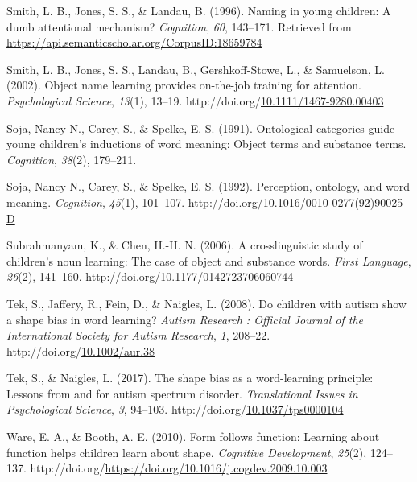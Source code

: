 \documentclass[10pt, letterpaper]{article}
\newenvironment{CSLReferences}%
  {}%
  {\par}
\begin{document}
\begin{CSLReferences}{1}{0}
\leavevmode{}%
Smith, L. B., Jones, S. S., \& Landau, B. (1996). Naming in young
children: A dumb attentional mechanism? \emph{Cognition}, \emph{60},
143--171. Retrieved from
\url{https://api.semanticscholar.org/CorpusID:18659784}

\leavevmode{}%
Smith, L. B., Jones, S. S., Landau, B., Gershkoff-Stowe, L., \&
Samuelson, L. (2002). Object name learning provides on-the-job training
for attention. \emph{Psychological Science}, \emph{13}(1), 13--19.
http://doi.org/\href{https://doi.org/10.1111/1467-9280.00403}{10.1111/1467-9280.00403}

\leavevmode{}%
Soja, Nancy N., Carey, S., \& Spelke, E. S. (1991). Ontological
categories guide young children's inductions of word meaning: Object
terms and substance terms. \emph{Cognition}, \emph{38}(2), 179--211.

\leavevmode{}%
Soja, Nancy N., Carey, S., \& Spelke, E. S. (1992). Perception,
ontology, and word meaning. \emph{Cognition}, \emph{45}(1), 101--107.
http://doi.org/\href{https://doi.org/10.1016/0010-0277(92)90025-D}{10.1016/0010-0277(92)90025-D}

\leavevmode{}%
Subrahmanyam, K., \& Chen, H.-H. N. (2006). A crosslinguistic study of
children's noun learning: {The} case of object and substance words.
\emph{First Language}, \emph{26}(2), 141--160.
http://doi.org/\href{https://doi.org/10.1177/0142723706060744}{10.1177/0142723706060744}

\leavevmode{}%
Tek, S., Jaffery, R., Fein, D., \& Naigles, L. (2008). Do children with
autism show a shape bias in word learning? \emph{Autism Research :
Official Journal of the International Society for Autism Research},
\emph{1}, 208--22.
http://doi.org/\href{https://doi.org/10.1002/aur.38}{10.1002/aur.38}

\leavevmode{}%
Tek, S., \& Naigles, L. (2017). The shape bias as a word-learning
principle: Lessons from and for autism spectrum disorder.
\emph{Translational Issues in Psychological Science}, \emph{3}, 94--103.
http://doi.org/\href{https://doi.org/10.1037/tps0000104}{10.1037/tps0000104}

\leavevmode{}%
Ware, E. A., \& Booth, A. E. (2010). Form follows function: Learning
about function helps children learn about shape. \emph{Cognitive
Development}, \emph{25}(2), 124--137.
http://doi.org/\url{https://doi.org/10.1016/j.cogdev.2009.10.003}


\end{CSLReferences}
\end{document}
